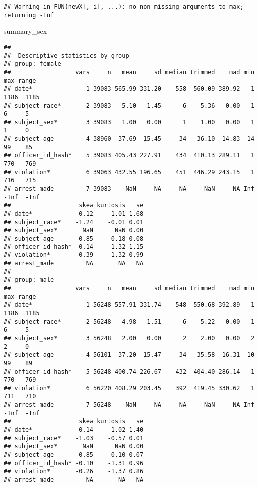 \documentclass[
]{article}
\newenvironment{Shaded}{\begin{snugshade}}{\end{snugshade}}
\newcommand{\NormalTok}[1]{#1}
\begin{document}
\begin{verbatim}
## Warning in FUN(newX[, i], ...): no non-missing arguments to max; returning -Inf
\end{verbatim}

\begin{Shaded}
\begin{Highlighting}[]
\NormalTok{summary\_sex}
\end{Highlighting}
\end{Shaded}

\begin{verbatim}
## 
##  Descriptive statistics by group 
## group: female
##                  vars     n   mean     sd median trimmed    mad min  max range
## date*               1 39083 565.99 331.20    558  560.09 389.92   1 1186  1185
## subject_race*       2 39083   5.10   1.45      6    5.36   0.00   1    6     5
## subject_sex*        3 39083   1.00   0.00      1    1.00   0.00   1    1     0
## subject_age         4 38960  37.69  15.45     34   36.10  14.83  14   99    85
## officer_id_hash*    5 39083 405.43 227.91    434  410.13 289.11   1  770   769
## violation*          6 39063 432.55 196.65    451  446.29 243.15   1  716   715
## arrest_made         7 39083    NaN     NA     NA     NaN     NA Inf -Inf  -Inf
##                   skew kurtosis   se
## date*             0.12    -1.01 1.68
## subject_race*    -1.24    -0.01 0.01
## subject_sex*       NaN      NaN 0.00
## subject_age       0.85     0.18 0.08
## officer_id_hash* -0.14    -1.32 1.15
## violation*       -0.39    -1.32 0.99
## arrest_made         NA       NA   NA
## ------------------------------------------------------------ 
## group: male
##                  vars     n   mean     sd median trimmed    mad min  max range
## date*               1 56248 557.91 331.74    548  550.68 392.89   1 1186  1185
## subject_race*       2 56248   4.98   1.51      6    5.22   0.00   1    6     5
## subject_sex*        3 56248   2.00   0.00      2    2.00   0.00   2    2     0
## subject_age         4 56101  37.20  15.47     34   35.58  16.31  10   99    89
## officer_id_hash*    5 56248 400.74 226.67    432  404.40 286.14   1  770   769
## violation*          6 56220 408.29 203.45    392  419.45 330.62   1  711   710
## arrest_made         7 56248    NaN     NA     NA     NaN     NA Inf -Inf  -Inf
##                   skew kurtosis   se
## date*             0.14    -1.02 1.40
## subject_race*    -1.03    -0.57 0.01
## subject_sex*       NaN      NaN 0.00
## subject_age       0.85     0.10 0.07
## officer_id_hash* -0.10    -1.31 0.96
## violation*       -0.26    -1.37 0.86
## arrest_made         NA       NA   NA
\end{verbatim}
\end{document}
